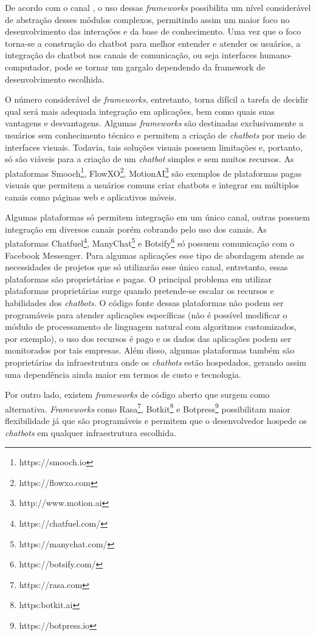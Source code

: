 De acordo com o canal , o uso dessas \textit{frameworks} possibilita um nível considerável de abstração desses módulos complexos, permitindo assim um maior foco no desenvolvimento das interações e da base de conhecimento. Uma vez que o foco torna-se a construção do chatbot para melhor entender e atender os usuários, a integração do chatbot nos canais de comunicação, ou seja interfaces humano-computador, pode se tornar um gargalo dependendo da framework de desenvolvimento escolhida.

O número considerável de \textit{frameworks}, entretanto, torna difícil a tarefa de decidir qual será mais adequada integração em aplicações, bem como quais suas vantagens e desvantagens. Algumas \textit{frameworks} são destinadas exclusivamente a usuários sem conhecimento técnico e permitem a criação de \textit{chatbots} por meio de interfaces visuais. Todavia, tais soluções visuais possuem limitações e, portanto, só são viáveis para a criação de um \textit{chatbot} simples e sem muitos recursos. As plataformas Smooch\footnote{https://smooch.io}, FlowXO\footnote{https://flowxo.com},   MotionAI\footnote{http://www.motion.ai} são exemplos de plataformas pagas visuais que permitem a usuários comuns criar chatbots e integrar em múltiplos canais como páginas web e aplicativos móveis.

Algumas plataformas só permitem integração em um único canal, outras possuem integração em diversos canais porém cobrando pelo uso dos canais. As plataformas Chatfuel\footnote{https://chatfuel.com/}, ManyChat\footnote{https://manychat.com/} e Botsify\footnote{https://botsify.com/} só possuem comunicação com o Facebook Messenger. Para algumas aplicações esse tipo de abordagem atende as necessidades de projetos que só utilizarão esse único canal, entretanto, essas plataformas são proprietárias e pagas. O principal problema em utilizar plataformas proprietárias surge quando pretende-se escalar os recursos e habilidades dos \textit{chatbots}. O código fonte dessas plataformas não podem ser programáveis para atender aplicações específicas (não é possível modificar o módulo de processamento de linguagem natural com algoritmos customizados, por exemplo), o uso dos recursos é pago e os dados das aplicações podem ser monitorados por tais empresas. Além disso, algumas plataformas também são proprietárias da infraestrutura onde os \textit{chatbots} estão hospedados, gerando assim uma dependência ainda maior em termos de custo e tecnologia.

Por outro lado, existem \textit{frameworks} de código aberto que surgem como alternativa. \textit{Frameworks} como Rasa\footnote{https://rasa.com}, Botkit\footnote{https:botkit.ai} e Botpress\footnote{https://botpress.io} possibilitam maior flexibilidade já que são programáveis e permitem que o desenvolvedor hospede os \textit{chatbots} em qualquer infraestrutura escolhida. 

